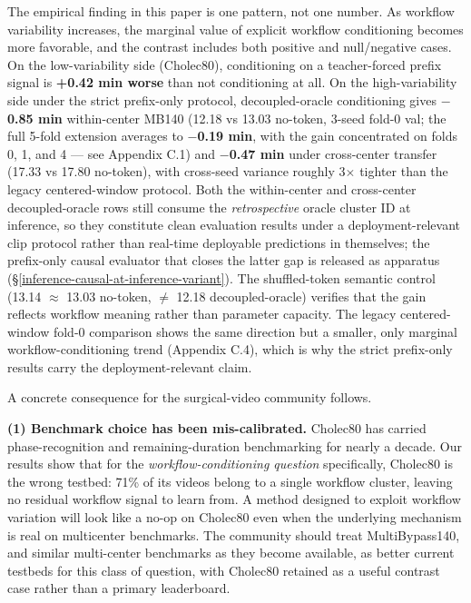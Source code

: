 The empirical finding in this paper is one pattern, not one number. As
workflow variability increases, the marginal value of explicit workflow
conditioning becomes more favorable, and the contrast includes both
positive and null/negative cases. On the low-variability side (Cholec80),
conditioning on a teacher-forced prefix signal is
\textbf{+0.42 min worse} than not conditioning at all. On the
high-variability side under the strict prefix-only protocol,
decoupled-oracle conditioning gives \textbf{$-$0.85 min} within-center
MB140 (12.18 vs 13.03 no-token, 3-seed fold-0 val; the full 5-fold
extension averages to \textbf{$-$0.19 min}, with the gain concentrated on
folds 0, 1, and 4 --- see Appendix C.1) and \textbf{$-$0.47 min}
under cross-center transfer (17.33 vs 17.80 no-token), with cross-seed
variance roughly 3$\times$ tighter than the legacy centered-window protocol.
Both the within-center and cross-center decoupled-oracle rows still
consume the \emph{retrospective} oracle cluster ID at inference, so they
constitute clean evaluation results under a deployment-relevant clip
protocol rather than real-time deployable predictions in themselves; the
prefix-only causal evaluator that closes the latter gap is released as
apparatus (\S\ref{inference-causal-at-inference-variant}). The shuffled-token semantic control (13.14
$\approx$ 13.03 no-token, $\neq$ 12.18 decoupled-oracle) verifies that the gain
reflects workflow meaning rather than parameter capacity. The legacy
centered-window fold-0 comparison shows the same direction but a smaller,
only marginal workflow-conditioning trend (Appendix C.4), which is why
the strict prefix-only results carry the deployment-relevant claim.

A concrete consequence for the surgical-video community follows.

\textbf{(1) Benchmark choice has been mis-calibrated.} Cholec80 has
carried phase-recognition and remaining-duration benchmarking for nearly
a decade. Our results show that for the \emph{workflow-conditioning
question} specifically, Cholec80 is the wrong testbed: 71\% of its
videos belong to a single workflow cluster, leaving no residual workflow
signal to learn from. A method designed to exploit workflow variation
will look like a no-op on Cholec80 even when the underlying mechanism is
real on multicenter benchmarks. The community should treat
MultiBypass140, and similar multi-center benchmarks as they become
available, as better current testbeds for this class of question, with
Cholec80 retained as a useful contrast case rather than a primary
leaderboard.

